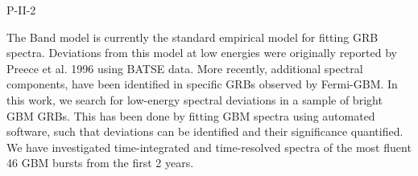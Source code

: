 P-II-2


\bigskip



\bigskip

\noindent The Band model is currently the standard empirical model for fitting GRB spectra. Deviations from this model at low energies were originally reported by Preece et al. 1996 using BATSE data. More recently, additional spectral components, have been identified in specific GRBs observed by Fermi-GBM. In this work, we search for low-energy spectral deviations in a sample of bright GBM GRBs. This has been done by fitting GBM spectra using automated software, such that deviations can be identified and their significance quantified. We have investigated time-integrated and time-resolved spectra of the most fluent 46 GBM bursts from the first 2 years.
